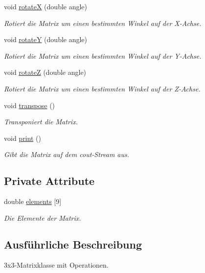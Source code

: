 \begin{DoxyCompactItemize}
void \hyperlink{classMatrix3D_ada7ce7ea9f2d0ef0fdda60ad73dad345}{rotate\-X} (double angle)
\begin{DoxyCompactList}\small\item\em Rotiert die Matrix um einen bestimmten Winkel auf der X-\/\-Achse. \end{DoxyCompactList}\item 
void \hyperlink{classMatrix3D_a649e1aa65466df65d63f1aef934e5fad}{rotate\-Y} (double angle)
\begin{DoxyCompactList}\small\item\em Rotiert die Matrix um einen bestimmten Winkel auf der Y-\/\-Achse. \end{DoxyCompactList}\item 
void \hyperlink{classMatrix3D_ad1933b95fb776dd31ad1b81d3515b029}{rotate\-Z} (double angle)
\begin{DoxyCompactList}\small\item\em Rotiert die Matrix um einen bestimmten Winkel auf der Z-\/\-Achse. \end{DoxyCompactList}\item 
void \hyperlink{classMatrix3D_a0d59cb6ea927264477a10b9d427966d6}{transpose} ()
\begin{DoxyCompactList}\small\item\em Transponiert die Matrix. \end{DoxyCompactList}\item 
void \hyperlink{classMatrix3D_a33c771d35de761fafc619773e1b253c5}{print} ()
\begin{DoxyCompactList}\small\item\em Gibt die Matrix auf dem cout-\/\-Stream aus. \end{DoxyCompactList}\end{DoxyCompactItemize}
\subsection*{Private Attribute}
\begin{DoxyCompactItemize}
\item 
double \hyperlink{classMatrix3D_aa24b85b09060684ec1559f22857ccfee}{elements} \mbox{[}9\mbox{]}
\begin{DoxyCompactList}\small\item\em Die Elemente der Matrix. \end{DoxyCompactList}\end{DoxyCompactItemize}


\subsection{Ausführliche Beschreibung}
3x3-\/\-Matrixklasse mit Operationen. 

